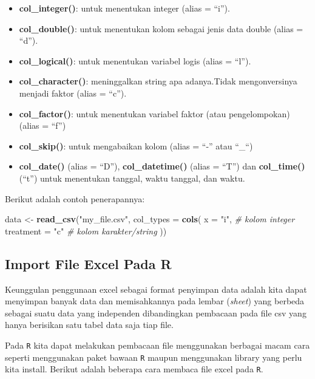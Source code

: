 \documentclass[]{book}
\newenvironment{Shaded}{\begin{snugshade}}{\end{snugshade}}
\newcommand{\KeywordTok}[1]{\textcolor[rgb]{0.13,0.29,0.53}{\textbf{#1}}}
\newcommand{\DataTypeTok}[1]{\textcolor[rgb]{0.13,0.29,0.53}{#1}}
\newcommand{\StringTok}[1]{\textcolor[rgb]{0.31,0.60,0.02}{#1}}
\newcommand{\CommentTok}[1]{\textcolor[rgb]{0.56,0.35,0.01}{\textit{#1}}}
\newcommand{\NormalTok}[1]{#1}
\providecommand{\tightlist}{%
  \setlength{\itemsep}{0pt}\setlength{\parskip}{0pt}}
\begin{document}
\begin{itemize}
\tightlist
\item
  \textbf{col\_integer()}: untuk menentukan integer (alias = ``i'').
\item
  \textbf{col\_double()}: untuk menentukan kolom sebagai jenis data
  double (alias = ``d'').
\item
  \textbf{col\_logical()}: untuk menentukan variabel logis (alias =
  ``l'').
\item
  \textbf{col\_character()}: meninggalkan string apa adanya.Tidak
  mengonversinya menjadi faktor (alias = ``c'').
\item
  \textbf{col\_factor()}: untuk menentukan variabel faktor (atau
  pengelompokan) (alias = ``f'')
\item
  \textbf{col\_skip()}: untuk mengabaikan kolom (alias = ``-'' atau
  ``\_``)
\item
  \textbf{col\_date()} (alias = ``D''), \textbf{col\_datetime()} (alias
  = ``T'') dan \textbf{col\_time()} (``t'') untuk menentukan tanggal,
  waktu tanggal, dan waktu.
\end{itemize}

Berikut adalah contoh penerapannya:

\begin{Shaded}
\begin{Highlighting}[]
\NormalTok{data <-}\StringTok{ }\KeywordTok{read_csv}\NormalTok{(}\StringTok{"my_file.csv"}\NormalTok{, }\DataTypeTok{col_types =} \KeywordTok{cols}\NormalTok{(}
  \DataTypeTok{x =} \StringTok{"i"}\NormalTok{, }\CommentTok{# kolom integer}
  \DataTypeTok{treatment =} \StringTok{"c"} \CommentTok{# kolom karakter/string}
\NormalTok{))}
\end{Highlighting}
\end{Shaded}

\subsection{Import File Excel Pada R}\label{import-file-excel-pada-r}

Keunggulan penggunaan excel sebagai format penyimpan data adalah kita
dapat menyimpan banyak data dan memisahkannya pada lembar (\emph{sheet})
yang berbeda sebagai suatu data yang independen dibandingkan pembacaan
pada file csv yang hanya berisikan satu tabel data saja tiap file.

Pada \texttt{R} kita dapat melakukan pembacaan file menggunakan berbagai
macam cara seperti menggunakan paket bawaan \texttt{R} maupun
menggunakan library yang perlu kita install. Berikut adalah beberapa
cara membaca file excel pada \texttt{R}.
\end{document}
